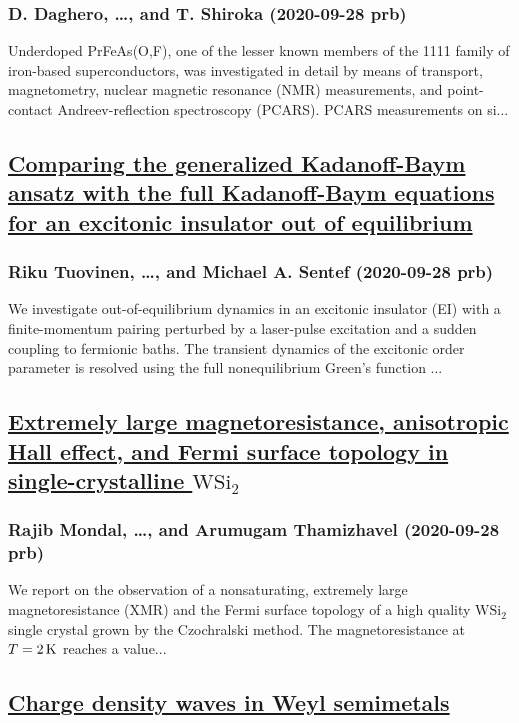 \subsubsection*{D. Daghero, \dots, and T. Shiroka (2020-09-28 prb)}
Underdoped PrFeAs(O,F), one of the lesser known members of the 1111 family of iron-based superconductors, was investigated in detail by means of transport, magnetometry, nuclear magnetic resonance (NMR) measurements, and point-contact Andreev-reflection spectroscopy (PCARS). PCARS measurements on si...
\subsection*{\href{http://link.aps.org/doi/10.1103/PhysRevB.102.115157}{Comparing the generalized Kadanoff-Baym ansatz with the full Kadanoff-Baym equations for an excitonic insulator out of equilibrium}}
\subsubsection*{Riku Tuovinen, \dots, and Michael A. Sentef (2020-09-28 prb)}
We investigate out-of-equilibrium dynamics in an excitonic insulator (EI) with a finite-momentum pairing perturbed by a laser-pulse excitation and a sudden coupling to fermionic baths. The transient dynamics of the excitonic order parameter is resolved using the full nonequilibrium Green's function ...
\subsection*{\href{http://link.aps.org/doi/10.1103/PhysRevB.102.115158}{Extremely large magnetoresistance, anisotropic Hall effect, and Fermi surface topology in single-crystalline $\mathrm{W}{\mathrm{Si}}_{2}$}}
\subsubsection*{Rajib Mondal, \dots, and Arumugam Thamizhavel (2020-09-28 prb)}
We report on the observation of a nonsaturating, extremely large magnetoresistance (XMR) and the Fermi surface topology of a high quality $\mathrm{W}{\mathrm{Si}}_{2}$ single crystal grown by the Czochralski method. The magnetoresistance at $T=2\phantom{\rule{0.16em}{0ex}}\mathrm{K}$ reaches a value...
\subsection*{\href{http://link.aps.org/doi/10.1103/PhysRevB.102.115159}{Charge density waves in Weyl semimetals}}
